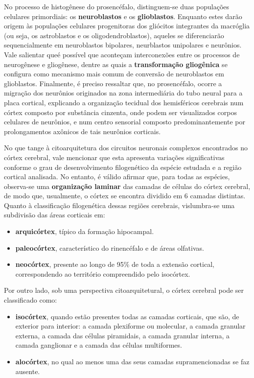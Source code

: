 \documentclass[
]{book}
\providecommand{\tightlist}{%
  \setlength{\itemsep}{0pt}\setlength{\parskip}{0pt}}
\begin{document}
No processo de histogênese do prosencéfalo, distinguem-se duas populações celulares primordiais: os \textbf{neuroblastos} e os \textbf{glioblastos}. Enquanto estes darão origem às populações celulares progenitoras dos gliócitos integrantes da macróglia (ou seja, os astroblastos e os oligodendroblastos), aqueles se diferenciarão sequencialmente em neuroblastos bipolares, neurblastos unipolares e neurônios. Vale salientar queé possível que aconteçam interconexões entre os processos de neurogênese e gliogênese, dentre as quais a \textbf{transformação gliogênica} se configura como mecanismo mais comum de conversão de neuroblastos em glioblastos. Finalmente, é preciso ressaltar que, no prosencéfalo, ocorre a migração dos neurônios originados na zona intermediária do tubo neural para a placa cortical, explicando a organização tecidual dos hemisféricos cerebrais num córtex composto por substância cinzenta, onde podem ser visualizados corpos celulares de neurônios, e num centro sensorial composto predominantemente por prolongamentos axônicos de tais neurônios corticais.

No que tange à citoarquitetura dos circuitos neuronais complexos encontrados no córtex cerebral, vale mencionar que esta apresenta variações significativas conforme o grau de desenvolvimento filogenético da espécie estudada e a região cortical analisada. No entanto, é válido afirmar que, para todas as espécies, observa-se uma \textbf{organização laminar} das camadas de células do córtex cerebral, de modo que, usualmente, o córtex se encontra dividido em 6 camadas distintas. Quanto à classificação filogenética dessas regiões cerebrais, vislumbra-se uma subdivisão das áreas corticais em:

\begin{itemize}
\tightlist
\item
  \textbf{arquicórtex}, típico da formação hipocampal.
\item
  \textbf{paleocórtex}, característico do rinencéfalo e de áreas olfativas.
\item
  \textbf{neocórtex}, presente ao longo de 95\% de toda a extensão cortical, correspondendo ao território compreendido pelo isocórtex.
\end{itemize}

Por outro lado, sob uma perspectiva citoarquitetural, o córtex cerebral pode ser classificado como:

\begin{itemize}
\tightlist
\item
  \textbf{isocórtex}, quando estão presentes todas as camadas corticais, que são, de exterior para interior: a camada plexiforme ou molecular, a camada granular externa, a camada das células piramidais, a camada granular interna, a camada ganglionar e a camada das células multiformes.
\item
  \textbf{alocórtex}, no qual ao menos uma das seus camadas supramencionadas se faz ausente.
\end{itemize}
\end{document}
